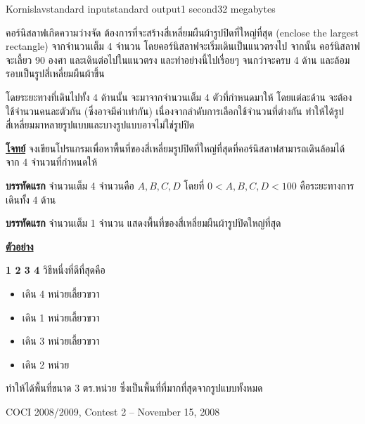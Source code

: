 \documentclass[11pt,a4paper]{article}
\begin{document}
\begin{problem}{Kornislav}{standard input}{standard output}{1 second}{32 megabytes}

คอร์นิสลาฟเกิดความว่างจัด ต้องการที่จะสร้างสี่เหลี่ยมผืนผ้ารูปปิดที่ใหญ่ที่สุด (enclose the largest rectangle) จากจำนวนเต็ม 4 จำนวน โดยคอร์นิสลาฟจะเริ่มเดินเป็นแนวตรงไป จากนั้น คอร์นิสลาฟจะเลี้ยว 90 องศา และเดินต่อไปในแนวตรง และทำอย่างนี้ไปเรื่อยๆ จนกว่าจะครบ 4 ด้าน และล้อมรอบเป็นรูปสี่เหลี่ยมผืนผ้าขึ้น

โดยระยะทางที่เดินไปทั้ง 4 ด้านนั้น จะมาจากจำนวนเต็ม 4 ตัวที่กำหนดมาให้ โดยแต่ละด้าน จะต้องใช้จำนวนคนละตัวกัน (ซึ่งอาจมีค่าเท่ากัน) เนื่องจากลำดับการเลือกใช้จำนวนที่ต่างกัน ทำให้ได้รูปสี่เหลี่ยมมาหลายรูปแบบและบางรูปแบบอาจไม่ใช่รูปปิด

\underline{\textbf{โจทย์}} จงเขียนโปรแกรมเพื่อหาพื้นที่ของสี่เหลี่ยมรูปปิดที่ใหญ่ที่สุดที่คอร์นิสลาฟสามารถเดินล้อมได้ จาก 4 จำนวนที่กำหนดให้

\InputFile

\textbf{บรรทัดแรก} จำนวนเต็ม 4 จำนวนคือ $A, B, C, D$ โดยที่ $0 < A, B, C, D < 100$ คือระยะทางการเดินทั้ง 4 ด้าน

\OutputFile

\textbf{บรรทัดแรก} จำนวนเต็ม 1 จำนวน แสดงพื้นที่ของสี่เหลี่ยมผืนผ้ารูปปิดใหญ่ที่สุด

\underline{\textbf{ตัวอย่าง}} 

\textbf {1 2 3 4}
วิธีหนึ่งที่ดีที่สุดคือ
\begin{itemize}
    \item เดิน 4 หน่วยเลี้ยวขวา
    \item เดิน 1 หน่วยเลี้ยวขวา
    \item เดิน 3 หน่วยเลี้ยวขวา
    \item เดิน 2 หน่วย
\end{itemize}

ทำให้ได้พื้นที่ขนาด 3 ตร.หน่วย ซึ่งเป็นพื้นที่ที่มากที่สุดจากรูปแบบทั้งหมด

\Source

COCI 2008/2009, Contest 2 – November 15, 2008

\Examples

\begin{example}
%
%
\end{example}

\end{problem}
\end{document}
